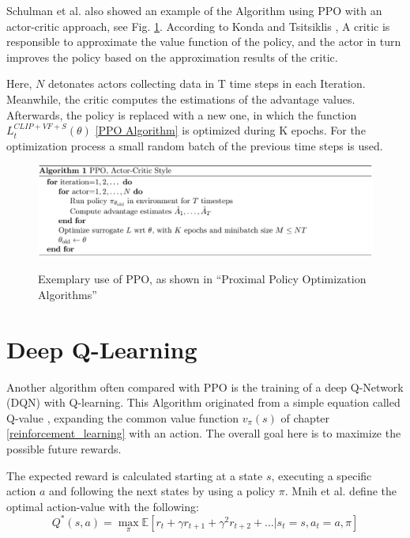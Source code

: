 Schulman et al. also showed an example of the Algorithm using PPO with an actor-critic approach, see Fig. \ref{fig:ppo_algo_code}. According to Konda and Tsitsiklis \cite{kots03}, A critic is responsible to approximate the value function of the policy, and the actor in turn improves the policy based on the approximation results of the critic.

Here, $N$ detonates actors collecting data in T time steps in each Iteration. Meanwhile, the critic computes the estimations of the advantage values. Afterwards, the policy is replaced with a new one, in which the function $L_{t}^{CLIP+VF+S}(\theta)$ \eqref{PPO Algorithm} is optimized during K epochs. For the optimization process a small random batch of the previous time steps is used.
\begin{figure}[hpbt]
    \centering
    \includegraphics[width=1\textwidth]{pictures/ppo_algo_code.png}\\
    \caption[Exemplary Use Of PPO]{Exemplary use of PPO, as shown in ``Proximal Policy Optimization Algorithms'' \cite{scwo17}}\label{fig:ppo_algo_code}
\end{figure}

\section{Deep Q-Learning}
Another algorithm often compared with PPO is the training of a deep Q-Network (DQN) with Q-learning. This Algorithm originated from a simple equation called Q-value \cite{jaja19}, expanding the common value function $v_\pi(s)$ of chapter \ref{reinforcement_learning} with an action. The overall goal here is to maximize the possible future rewards. 

The expected reward is calculated starting at a state $s$, executing a specific action $a$ and following the next states by using a policy $\pi$. Mnih et al. \cite{mnka13} define the optimal action-value with the following:
\begin{equation}\label{qvalue}
    Q^*(s,a) = \max_{\pi} \mathbb{E}\left[ r_{t} + \gamma r_{t+1} + \gamma^2 r_{t+2} + \ldots | s_t = s, a_t = a, \pi \right]
\end{equation}

